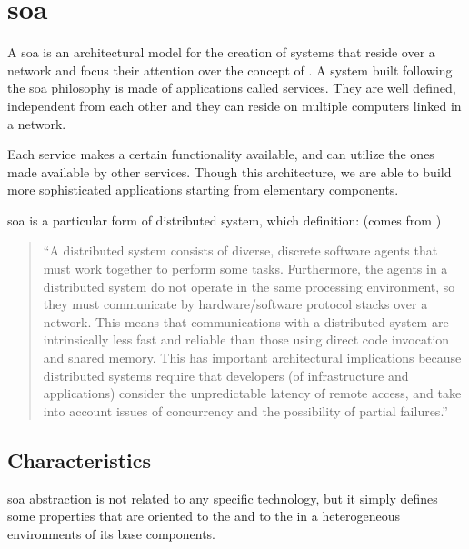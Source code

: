 %
%
\section{\acf{soa}}
\label{sec:architecture-soa}
A \acf{soa} is an architectural model for the creation of systems that reside over a network and
focus their attention over the concept of . A system built following the \ac{soa}
philosophy is made of applications called services. They are well defined, independent from each
other and they can reside on multiple computers linked in a network.

Each service makes a certain functionality available, and can utilize the ones made available by other
services. Though this architecture, we are able to build more sophisticated applications starting from
elementary components.

\ac{soa} is a particular form of distributed system, which definition: (comes from \cite{distributedSystem})

\begin{center}
	\begin{quote}
		``A distributed system consists of diverse, discrete software agents that must work together to perform
		some tasks. Furthermore, the agents in a distributed system do not operate in the same processing
		environment, so they must communicate by hardware/software protocol stacks over a network. This
		means that communications with a distributed system are intrinsically less fast and reliable than
		those using direct code invocation and shared memory. This has important architectural implications
		because distributed systems require that developers (of infrastructure and applications) consider
		the unpredictable latency of remote access, and take into account issues of concurrency and the
		possibility of partial failures.''
	\end{quote}
\end{center}

\subsection{Characteristics}
\label{sec:architecture-soa-characteristics}
\ac{soa} abstraction is not related to any specific technology, but it simply defines some properties 
that are oriented to the  and to the  in a heterogeneous environments
of its base components.

